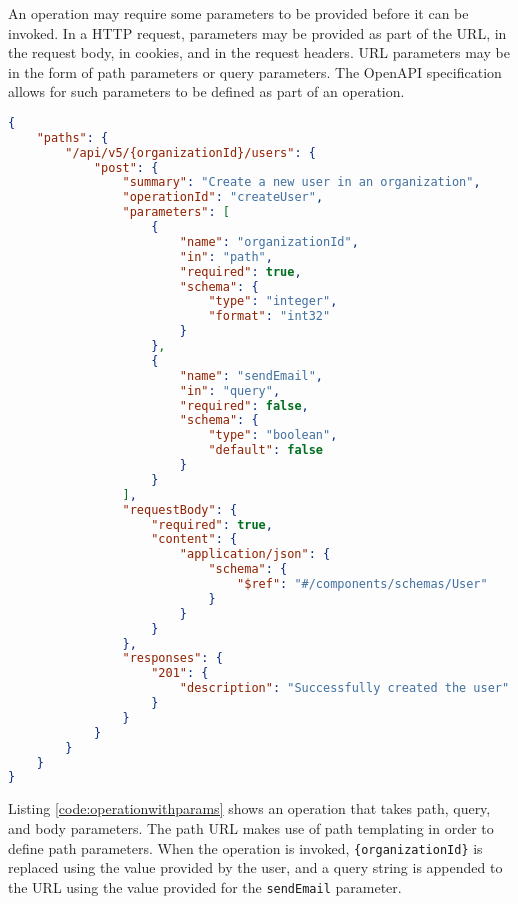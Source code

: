 An operation may require some parameters to be provided before it can be invoked. In a HTTP request, parameters may be provided as part of the URL, in the request body, in cookies, and in the request headers. URL parameters may be in the form of path parameters or query parameters. The OpenAPI specification allows for such parameters to be defined as part of an operation.
\begin{minipage}{\textwidth}
\begin{lstlisting}[caption={A \texttt{POST} request with parameters},label={code:operationwithparams},language=json]
{
    "paths": {
        "/api/v5/{organizationId}/users": {
            "post": {
                "summary": "Create a new user in an organization",
                "operationId": "createUser",
                "parameters": [
                    {
                        "name": "organizationId",
                        "in": "path",
                        "required": true,
                        "schema": {
                            "type": "integer",
                            "format": "int32"
                        }
                    },
                    {
                        "name": "sendEmail",
                        "in": "query",
                        "required": false,
                        "schema": {
                            "type": "boolean",
                            "default": false
                        }
                    }
                ],
                "requestBody": {
                    "required": true,
                    "content": {
                        "application/json": {
                            "schema": {
                                "$ref": "#/components/schemas/User"
                            }
                        }
                    }
                },
                "responses": {
                    "201": {
                        "description": "Successfully created the user"
                    }
                }
            }
        }
    }
}
\end{lstlisting}
\end{minipage}
Listing \ref{code:operationwithparams} shows an operation that takes path, query, and body parameters. The path URL makes use of path templating in order to define path parameters. When the operation is invoked, \texttt{\{organizationId\}} is replaced using the value provided by the user, and a query string is appended to the URL using the value provided for the \texttt{sendEmail} parameter.

